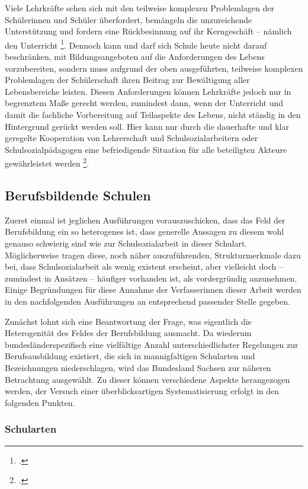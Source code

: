Viele Lehrkräfte sehen sich mit den teilweise komplexen Problemlagen der Schülerinnen und Schüler überfordert, bemängeln die unzureichende Unterstützung und fordern eine Rückbesinnung auf ihr Kerngeschäft -- nämlich den Unterricht \footcite[vgl.][10]{Drilling2004}. Dennoch kann und darf sich Schule heute nicht darauf beschränken, mit Bildungsangeboten auf die Anforderungen des Lebens vorzubereiten, sondern muss aufgrund der oben ausgeführten, teilweise komplexen Problemlagen der Schülerschaft ihren Beitrag zur Bewältigung aller Lebensbereiche leisten. Diesen Anforderungen können Lehrkräfte jedoch nur in begrenztem Maße gerecht werden, zumindest dann, wenn der Unterricht und damit die fachliche Vorbereitung auf Teilaspekte des Lebens, nicht ständig in den Hintergrund gerückt werden soll. Hier kann nur durch die dauerhafte und klar geregelte Kooperation von Lehrerschaft und Schulsozialarbeitern oder Schulsozialpädagogen eine befriedigende Situation für alle beteiligten Akteure gewährleistet werden \footcite[vgl.][9ff]{Drilling2004}. 

\subsection{Berufsbildende Schulen}
\label{sec:BerufsbildendeSchulen}

Zuerst einmal ist jeglichen Ausführungen vorauszuschicken, dass das Feld der Berufsbildung ein so heterogenes ist, dass generelle Aussagen zu diesem wohl genauso schwierig sind wie zur Schulsozialarbeit in dieser Schulart. Möglicherweise tragen diese, noch näher auszuführenden, Strukturmerkmale dazu bei, dass Schulsozialarbeit als wenig existent erscheint, aber vielleicht doch -- zumindest in Ansätzen -- häufiger vorhanden ist, als vordergründig anzunehmen. Einige Begründungen für diese Annahme der Verfasserinnen dieser Arbeit werden in den nachfolgenden Ausführungen an entsprechend passender Stelle gegeben. 

Zunächst lohnt sich eine Beantwortung der Frage, was eigentlich die Heterogenität des Feldes der Berufsbildung ausmacht. Da wiederum bundesländerspezifisch eine vielfältige Anzahl unterschiedlichster Regelungen zur Berufsausbildung existiert, die sich in mannigfaltigen Schularten und Bezeichnungen niederschlagen, wird das Bundesland Sachsen zur näheren Betrachtung ausgewählt. Zu dieser können verschiedene Aspekte herangezogen werden, der Versuch einer überblicksartigen Systematisierung erfolgt in den folgenden Punkten.

\subsubsection{Schularten}
\label{sec:Schularten}

